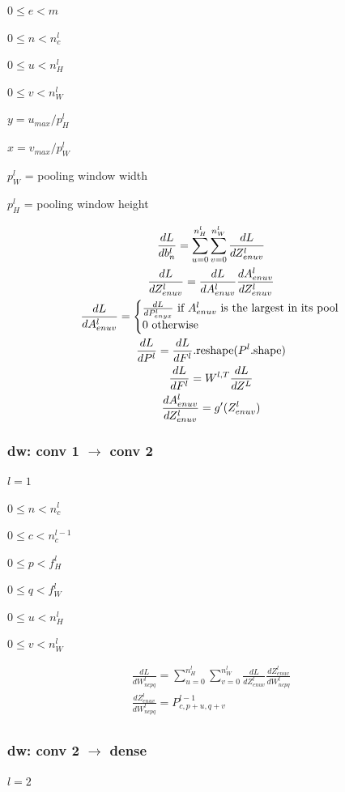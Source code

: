 \documentclass[12pt]{article}
\begin{document}
$0 \le e < m$

$0 \le n < n_c^l$

$0 \le u < n_H^l$

$0 \le v < n_W^l$

$y = u_{max}/p^l_H$

$x = v_{max}/p^l_W$

$p_W^l$ = pooling window width

$p_H^l$ = pooling window height

\begin{gather*}
    \frac{dL}{db^l_n} = \sum_{u=0}^{n_H^l} \sum_{v=0}^{n_W^l} \frac{dL}{dZ^l_{enuv}}\\
    \frac{dL}{dZ^l_{enuv}} = \frac{dL}{dA^l_{enuv}} \frac{dA^l_{enuv}}{dZ^l_{enuv}}\\
    \frac{dL}{dA^l_{enuv}} = \left\{\begin{array}{@{}l@{}}
            \frac{dL}{dP^l_{enyx}} \text{ if $A^l_{enuv}$ is the largest in its pool}\\
            0 \text{ otherwise}
    \end{array}\right.\,\\
    \frac{dL}{dP^l} = \frac{dL}{dF^l}.\text{reshape}(P^l.\text{shape})\\
    \frac{dL}{dF^l} = W^{l,T} \frac{dL}{dZ^L}\\
    \frac{dA^l_{enuv}}{dZ^l_{enuv}} = g'(Z^l_{enuv})
\end{gather*}

\subsubsection{dw: conv 1 $\rightarrow$ conv 2}
$l = 1$

$0 \le n < n_c^l$

$0 \le c < n_c^{l-1}$

$0 \le p < f_H^l$

$0 \le q < f_W^l$

$0 \le u < n_H^l$

$0 \le v < n_W^l$

\begin{gather*}
    \frac{dL}{dW^l_{ncpq}} = \sum_{u=0}^{n_H^l} \sum_{v=0}^{n_W^l} \frac{dL}{dZ^l_{enuv}}
    \frac{dZ^l_{enuv}}{dW^l_{ncpq}}\\
    \frac{dZ^l_{enuv}}{dW^l_{ncpq}} = P^{l-1}_{c,p+u,q+v}\\
\end{gather*}

\subsubsection{dw: conv 2 $\rightarrow$ dense}
$l = 2$
\end{document}
